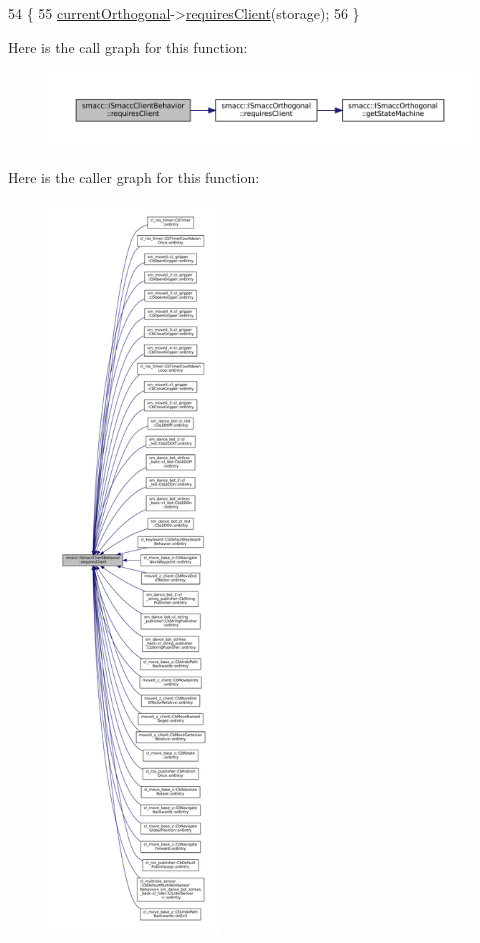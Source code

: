 \begin{DoxyCode}
54 \{
55     \hyperlink{classsmacc_1_1ISmaccClientBehavior_a0d606b804769a11b4f672243a014bed8}{currentOrthogonal}->\hyperlink{classsmacc_1_1ISmaccOrthogonal_a602e16b09f8a1b3de889f2f3d90a3211}{requiresClient}(storage);
56 \}
\end{DoxyCode}
Here is the call graph for this function\+:
\nopagebreak
\begin{figure}[H]
\begin{center}
\leavevmode
\includegraphics[width=350pt]{classsmacc_1_1ISmaccClientBehavior_a32b16e99e3b4cb289414203dc861a440_cgraph}
\end{center}
\end{figure}
Here is the caller graph for this function\+:
\nopagebreak
\begin{figure}[H]
\begin{center}
\leavevmode
\includegraphics[height=550pt]{classsmacc_1_1ISmaccClientBehavior_a32b16e99e3b4cb289414203dc861a440_icgraph}
\end{center}
\end{figure}
